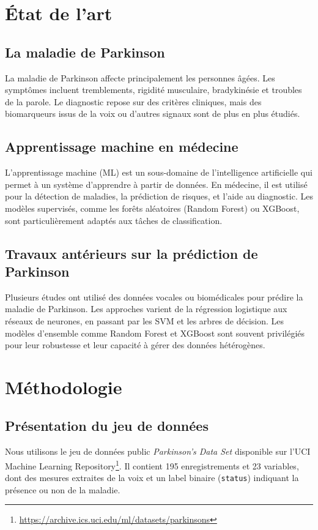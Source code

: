 \documentclass[12pt,a4paper]{report}
\begin{document}
\chapter{État de l'art}
\section{La maladie de Parkinson}
La maladie de Parkinson affecte principalement les personnes âgées. Les symptômes incluent tremblements, rigidité musculaire, bradykinésie et troubles de la parole. Le diagnostic repose sur des critères cliniques, mais des biomarqueurs issus de la voix ou d'autres signaux sont de plus en plus étudiés.

\section{Apprentissage machine en médecine}
L'apprentissage machine (ML) est un sous-domaine de l'intelligence artificielle qui permet à un système d'apprendre à partir de données. En médecine, il est utilisé pour la détection de maladies, la prédiction de risques, et l'aide au diagnostic. Les modèles supervisés, comme les forêts aléatoires (Random Forest) ou XGBoost, sont particulièrement adaptés aux tâches de classification.

\section{Travaux antérieurs sur la prédiction de Parkinson}
Plusieurs études ont utilisé des données vocales ou biomédicales pour prédire la maladie de Parkinson. Les approches varient de la régression logistique aux réseaux de neurones, en passant par les SVM et les arbres de décision. Les modèles d'ensemble comme Random Forest et XGBoost sont souvent privilégiés pour leur robustesse et leur capacité à gérer des données hétérogènes.

\chapter{Méthodologie}
\section{Présentation du jeu de données}
Nous utilisons le jeu de données public \textit{Parkinson's Data Set} disponible sur l'UCI Machine Learning Repository\footnote{\url{https://archive.ics.uci.edu/ml/datasets/parkinsons}}. Il contient 195 enregistrements et 23 variables, dont des mesures extraites de la voix et un label binaire (\texttt{status}) indiquant la présence ou non de la maladie.
\end{document}
